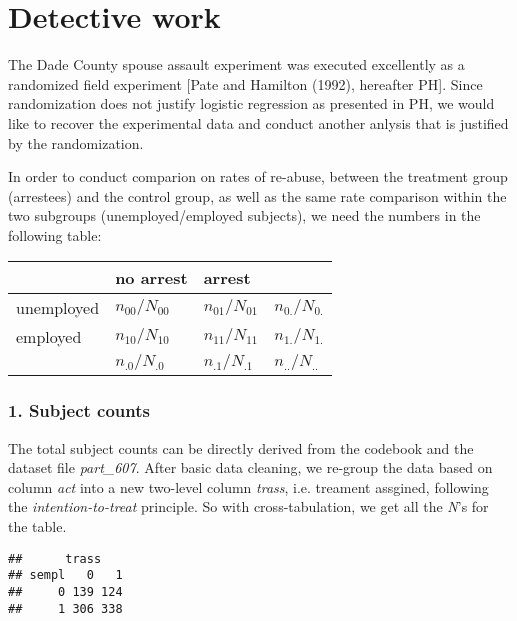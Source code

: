\documentclass{article}\usepackage{graphicx, color}
\makeatletter
\newenvironment{kframe}{%
 \def\at@end@of@kframe{}%
 \ifinner\ifhmode%
  \def\at@end@of@kframe{\end{minipage}}%
  \begin{minipage}{\columnwidth}%
 \fi\fi%
 \def\FrameCommand##1{\hskip\@totalleftmargin \hskip-\fboxsep
 \colorbox{shadecolor}{##1}\hskip-\fboxsep
     \hskip-\linewidth \hskip-\@totalleftmargin \hskip\columnwidth}%
 \MakeFramed {\advance\hsize-\width
   \@totalleftmargin\z@ \linewidth\hsize
   \@setminipage}}%
 {\par\unskip\endMakeFramed%
 \at@end@of@kframe}
\newenvironment{knitrout}{}{} %
\makeatother
\begin{document}
\section*{Detective work}

\hspace{12 pt} The Dade County spouse assault experiment was executed
excellently as a randomized field experiment [Pate and Hamilton
(1992), hereafter PH]. Since randomization does not justify logistic
regression as presented in PH, we would like to recover the experimental
data and conduct another anlysis that is justified by the randomization. 


In order to conduct comparion on rates of re-abuse,
between the treatment group (arrestees) and the control
group, as well as the same rate comparison within the two subgroups
(unemployed/employed subjects), we need the numbers in the following table:

\begin{center}
\begin{tabular}{l|l|l|l}
                    & no arrest            & arrest                & \\ \hline
unemployed & {$n_{00}/N_{00}$} & {$n_{01}/N_{01}$} & {$n_{0.}/N_{0.}$}\\ \hline
employed     & {$n_{10}/N_{10}$} & {$n_{11}/N_{11}$} & {$n_{1.}/N_{1.}$}\\ \hline
                    & {$n_{.0}/N_{.0}$}   & {$n_{.1}/N_{.1}$}  & {$n_{..}/N_{..}$}\\ 
\end{tabular}
\end{center}


\subsubsection*{1. Subject counts}
\hspace{12 pt} The total subject counts can be directly derived from the codebook and
the dataset file \textit{part\_607}. After basic data cleaning, we
re-group the data based on column \textit{act} into a new two-level
column \textit{trass}, i.e. treament assgined, following the
\textit{intention-to-treat} principle. So with cross-tabulation, we
get all the \textit{N}'s for the table.

\begin{knitrout}
\color{fgcolor}\begin{kframe}
\begin{verbatim}
##      trass
## sempl   0   1
##     0 139 124
##     1 306 338
\end{verbatim}
\end{kframe}
\end{knitrout}
\end{document}

